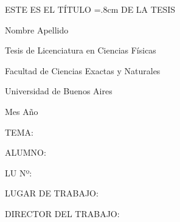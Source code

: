 \documentclass[a4paper,11pt,oneside]{book}
\begin{document}
\bigskip\bigskip\bigskip\bigskip\bigskip\bigskip\bigskip\bigskip\bigskip


\bigskip\bigskip\bigskip\bigskip\bigskip\bigskip\bigskip\bigskip\bigskip




\begin{center}

\baselineskip=0.8cm
\vspace*{4cm}

    {\huge ESTE ES EL TÍTULO}
\baselineskip=.8cm
    {\huge DE LA TESIS}

    \smallskip\smallskip\smallskip\smallskip\smallskip\smallskip

    {\large Nombre Apellido}

    \bigskip\bigskip\bigskip\bigskip\bigskip\bigskip\bigskip\bigskip\bigskip%
    \bigskip\bigskip\bigskip\bigskip\bigskip\bigskip\bigskip\bigskip\bigskip%
    \bigskip\bigskip\bigskip\bigskip\bigskip\bigskip\bigskip\bigskip\bigskip%

    {\large Tesis de Licenciatura en Ciencias Físicas}

    {\large Facultad de Ciencias Exactas y Naturales}

    {\large Universidad de Buenos Aires}

    {\large Mes Año}

\end{center}

\thispagestyle{empty}%



\newpage
    \thispagestyle{empty}

    {\large TEMA:}

    \bigskip

    {\large ALUMNO:}

    \bigskip

    {\large LU Nº:}

    \bigskip

    {\large LUGAR DE TRABAJO:}


    \bigskip

    {\large DIRECTOR DEL TRABAJO:}
\end{document}
